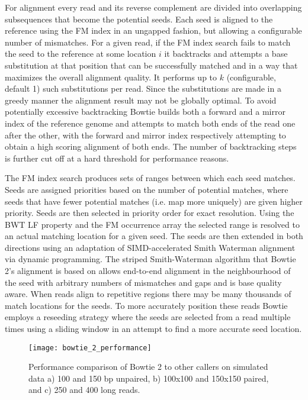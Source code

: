 For alignment every read and its reverse complement are divided into overlapping subsequences that become the potential seeds. Each seed is aligned to the reference using the FM index in an ungapped fashion, but allowing a configurable number of mismatches. For a given read, if the FM index search fails to match the seed to the reference at some location $i$ it backtracks and attempts a base substitution at that position that can be successfully matched and in a way that maximizes the overall alignment quality. It performs up to $k$ (configurable, default 1) such substitutions per read. Since the substitutions are made in a greedy manner the alignment result may not be globally optimal. To avoid potentially excessive backtracking Bowtie builds both a forward and a mirror index of the reference genome and attempts to match both ends of the read one after the other, with the forward and mirror index respectively attempting to obtain a high scoring alignment of both ends. The number of backtracking steps is further cut off at a hard threshold for performance reasons.

The FM index search produces sets of ranges between which each seed matches. Seeds are assigned priorities based on the number of potential matches, where seeds that have fewer potential matches (i.e. map more uniquely) are given higher priority. Seeds are then selected in priority order for exact resolution. Using the BWT LF property and the FM occurrence array the selected range is resolved to an actual matching location for a given seed. The seeds are then extended in both directions using an adaptation of SIMD-accelerated Smith Waterman alignment via dynamic programming. The striped Smith-Waterman algorithm\autocite{farrar2006striped} that Bowtie 2's alignment is based on allows end-to-end alignment in the neighbourhood of the seed with arbitrary numbers of mismatches and gaps and is base quality aware. When reads align to repetitive regions there may be many thousands of match locations for the seeds. To more accurately position these reads Bowtie employs a reseeding strategy where the seeds are selected from a read multiple times using a sliding window in an attempt to find a more accurate seed location. 

\begin{figure}[H]
    \texttt{[image: bowtie\_2\_performance]}
    \centering
    \caption {Performance comparison of Bowtie 2 to other callers on simulated data a) 100 and 150 bp unpaired, b) 100x100 and 150x150 paired, and c) 250 and 400 long reads.\autocite{langmead2012fast}}
    \label{fig:bowtie_2_performance}
\end{figure}

